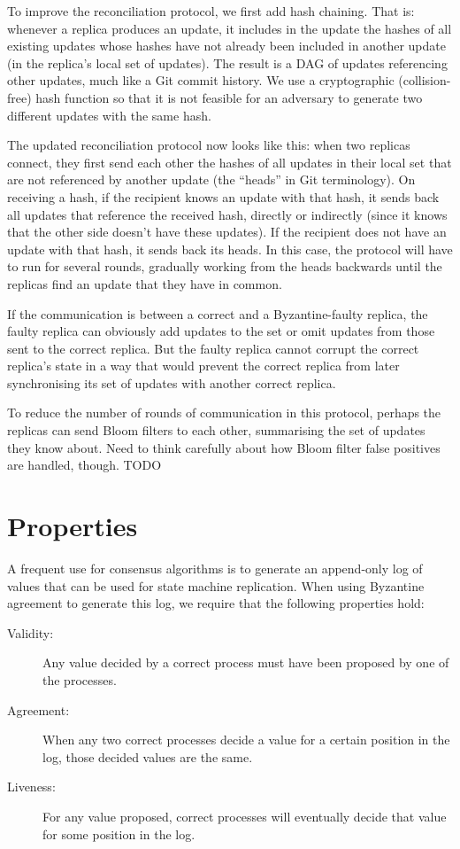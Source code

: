 \documentclass[manuscript]{acmart}
\begin{document}
To improve the reconciliation protocol, we first add hash chaining.
That is: whenever a replica produces an update, it includes in the update the hashes of all existing updates whose hashes have not already been included in another update (in the replica's local set of updates).
The result is a DAG of updates referencing other updates, much like a Git commit history.
We use a cryptographic (collision-free) hash function so that it is not feasible for an adversary to generate two different updates with the same hash.

The updated reconciliation protocol now looks like this: when two replicas connect, they first send each other the hashes of all updates in their local set that are not referenced by another update (the ``heads'' in Git terminology).
On receiving a hash, if the recipient knows an update with that hash, it sends back all updates that reference the received hash, directly or indirectly (since it knows that the other side doesn't have these updates).
If the recipient does not have an update with that hash, it sends back its heads.
In this case, the protocol will have to run for several rounds, gradually working from the heads backwards until the replicas find an update that they have in common.

If the communication is between a correct and a Byzantine-faulty replica, the faulty replica can obviously add updates to the set or omit updates from those sent to the correct replica.
But the faulty replica cannot corrupt the correct replica's state in a way that would prevent the correct replica from later synchronising its set of updates with another correct replica.

To reduce the number of rounds of communication in this protocol, perhaps the replicas can send Bloom filters to each other, summarising the set of updates they know about.
Need to think carefully about how Bloom filter false positives are handled, though. TODO

\section{Properties}

A frequent use for consensus algorithms is to generate an append-only log of values that can be used for state machine replication.
When using Byzantine agreement to generate this log, we require that the following properties hold:

\begin{description}
\item[Validity:] Any value decided by a correct process must have been proposed by one of the processes.
\item[Agreement:] When any two correct processes decide a value for a certain position in the log, those decided values are the same.
\item[Liveness:] For any value proposed, correct processes will eventually decide that value for some position in the log.
\end{description}
\end{document}
